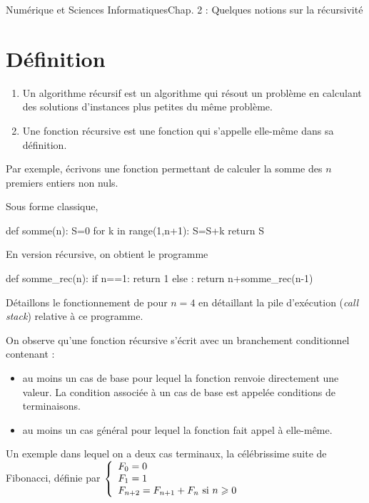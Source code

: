 \documentclass[11pt,a4paper,french,twoside]{PMCours}
\begin{document}
{Numérique et Sciences Informatiques}{Chap. 2 : Quelques notions sur la récursivité}
\section{Définition}
\begin{Definition}{}
\begin{enumerate}
\item Un algorithme récursif est un algorithme qui résout un problème 
en calculant des solutions d'instances plus petites du même problème.
\item Une fonction récursive est une fonction qui s'appelle elle-même 
dans sa définition. 
\end{enumerate}
\end{Definition}

Par exemple, écrivons une fonction permettant de calculer la somme 
des $n$ premiers entiers non nuls. 

Sous forme classique,
\begin{Python}
def somme(n):
	S=0
	for k in range(1,n+1):
		S=S+k
	return S
\end{Python}
En version récursive, on obtient le programme 
\begin{Python}
def somme_rec(n):
	if n==1:
		return 1
	else :
		return n+somme_rec(n-1)
\end{Python}
Détaillons le fonctionnement de  pour $n=4$ en détaillant 
la pile d'exécution (\emph{call stack}) relative à ce programme.

\newpage
On observe qu'une fonction récursive s'écrit avec un branchement conditionnel contenant :  
\begin{itemize}
\item au moins un {\color{red} cas de base} pour lequel la fonction renvoie 
directement une valeur. La condition associée à un cas de base est appelée {\color{red} conditions de terminaisons}.
\item au moins un cas général pour lequel la fonction fait appel à elle-même. 
\end{itemize}

Un exemple dans lequel on a deux cas terminaux, la célébrissime 
suite de Fibonacci, définie par 
$\left\{\begin{array}{l}
F_0=0\\
F_1=1\\
F_{n+2}=F_{n+1}+F_n\text{ si $n\geqslant 0$}
\end{array}\right.$
\end{document}
